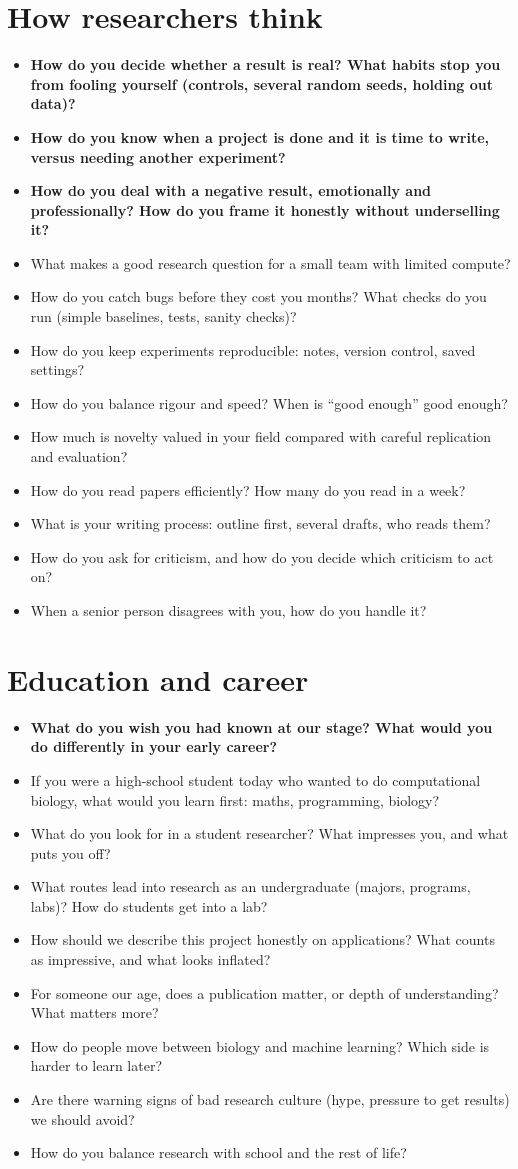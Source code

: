 \documentclass[10.5pt]{article}
\newcommand{\Q}[1]{\item[$\square$] #1}
\newcommand{\QS}[1]{\item[\textbf{$\star$}] \textbf{#1}}
\begin{document}
\section{How researchers think}
\begin{itemize}
\QS{How do you decide whether a result is real? What habits stop you from fooling yourself (controls, several random seeds, holding out data)?}
\QS{How do you know when a project is done and it is time to write, versus needing another experiment?}
\QS{How do you deal with a negative result, emotionally and professionally? How do you frame it honestly without underselling it?}
\Q{What makes a good research question for a small team with limited compute?}
\Q{How do you catch bugs before they cost you months? What checks do you run (simple baselines, tests, sanity checks)?}
\Q{How do you keep experiments reproducible: notes, version control, saved settings?}
\Q{How do you balance rigour and speed? When is ``good enough'' good enough?}
\Q{How much is novelty valued in your field compared with careful replication and evaluation?}
\Q{How do you read papers efficiently? How many do you read in a week?}
\Q{What is your writing process: outline first, several drafts, who reads them?}
\Q{How do you ask for criticism, and how do you decide which criticism to act on?}
\Q{When a senior person disagrees with you, how do you handle it?}
\end{itemize}

\section{Education and career}
\begin{itemize}
\QS{What do you wish you had known at our stage? What would you do differently in your early career?}
\Q{If you were a high-school student today who wanted to do computational biology, what would you learn first: maths, programming, biology?}
\Q{What do you look for in a student researcher? What impresses you, and what puts you off?}
\Q{What routes lead into research as an undergraduate (majors, programs, labs)? How do students get into a lab?}
\Q{How should we describe this project honestly on applications? What counts as impressive, and what looks inflated?}
\Q{For someone our age, does a publication matter, or depth of understanding? What matters more?}
\Q{How do people move between biology and machine learning? Which side is harder to learn later?}
\Q{Are there warning signs of bad research culture (hype, pressure to get results) we should avoid?}
\Q{How do you balance research with school and the rest of life?}
\end{itemize}
\end{document}
